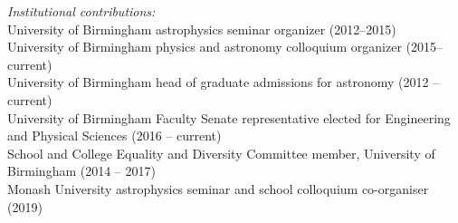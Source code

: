 \documentclass[margin,line]{res}
\begin{document}
\begin{resume}
{\it Institutional contributions:}\\
University of Birmingham astrophysics seminar organizer (2012--2015)\\
University of Birmingham physics and astronomy colloquium organizer (2015--current)\\
University of Birmingham head of graduate admissions for astronomy (2012 -- current)\\
University of Birmingham Faculty Senate representative elected for Engineering and Physical Sciences (2016 -- current)\\
School and College Equality and Diversity Committee member, University of Birmingham (2014 -- 2017) \\
Monash University astrophysics seminar and school colloquium co-organiser (2019)\\





\end{resume}
\end{document}

